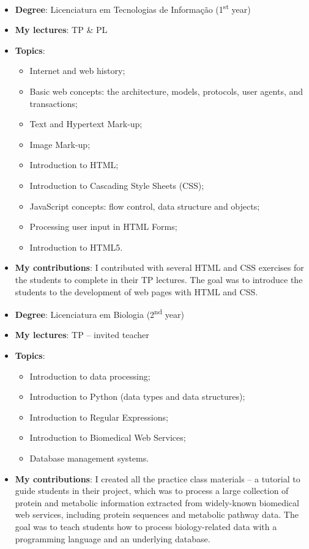 \begin{itemize}
    \item \textbf{Degree}: Licenciatura em Tecnologias de Informação (1\textsuperscript{st} year)
    \item \textbf{My lectures}: TP \& PL
    \item \textbf{Topics}:
    \begin{itemize}
        \item Internet and web history;
        \item Basic web concepts: the architecture, models, protocols, user agents, and transactions;
        \item Text and Hypertext Mark-up;
        \item Image Mark-up;
        \item Introduction to HTML;
        \item Introduction to Cascading Style Sheets (CSS);
        \item JavaScript concepts: flow control, data structure and objects;
        \item Processing user input in HTML Forms;
        \item Introduction to HTML5.
    \end{itemize}
    \item \textbf{My contributions}: I contributed with several HTML and CSS exercises for the students to complete in their TP lectures. The goal was to introduce the students to the development of web pages with HTML and CSS.
\end{itemize}


\begin{itemize}
    \item \textbf{Degree}: Licenciatura em Biologia (2\textsuperscript{nd} year)
    \item \textbf{My lectures}: TP -- invited teacher
    \item \textbf{Topics}:
    \begin{itemize}
        \item Introduction to data processing;
        \item Introduction to Python (data types and data structures);
        \item Introduction to Regular Expressions;
        \item Introduction to Biomedical Web Services;
        \item Database management systems.
    \end{itemize}
    \item \textbf{My contributions}: I created all the practice class materials -- a tutorial to guide students in their project, which was to process a large collection of protein and metabolic information extracted from widely-known biomedical web services, including protein sequences and metabolic pathway data. The goal was to teach students how to process biology-related data with a programming language and an underlying database.
\end{itemize}


